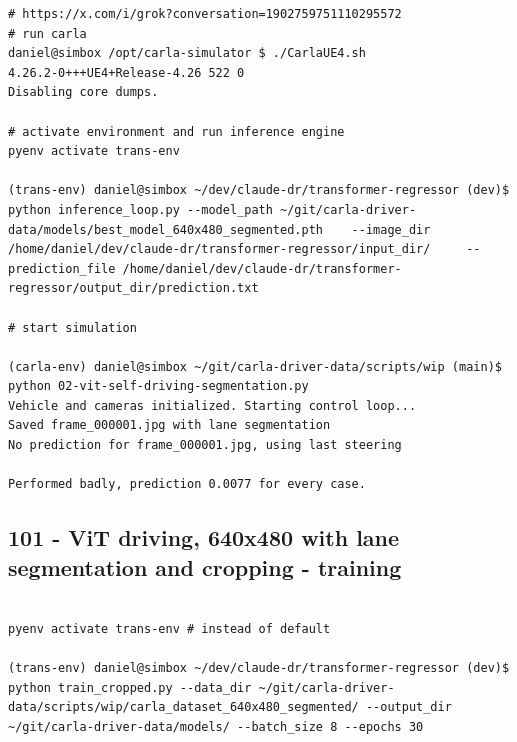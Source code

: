 \begin{verbatim}
# https://x.com/i/grok?conversation=1902759751110295572
# run carla
daniel@simbox /opt/carla-simulator $ ./CarlaUE4.sh 
4.26.2-0+++UE4+Release-4.26 522 0
Disabling core dumps.

# activate environment and run inference engine
pyenv activate trans-env

(trans-env) daniel@simbox ~/dev/claude-dr/transformer-regressor (dev)$ python inference_loop.py --model_path ~/git/carla-driver-data/models/best_model_640x480_segmented.pth    --image_dir /home/daniel/dev/claude-dr/transformer-regressor/input_dir/     --prediction_file /home/daniel/dev/claude-dr/transformer-regressor/output_dir/prediction.txt

# start simulation

(carla-env) daniel@simbox ~/git/carla-driver-data/scripts/wip (main)$ python 02-vit-self-driving-segmentation.py 
Vehicle and cameras initialized. Starting control loop...
Saved frame_000001.jpg with lane segmentation
No prediction for frame_000001.jpg, using last steering

Performed badly, prediction 0.0077 for every case.

\end{verbatim}

\subsection{101 - ViT driving, 640x480 with lane segmentation and cropping - training}
\label{app_res:100b}

\begin{verbatim}

pyenv activate trans-env # instead of default 

(trans-env) daniel@simbox ~/dev/claude-dr/transformer-regressor (dev)$ python train_cropped.py --data_dir ~/git/carla-driver-data/scripts/wip/carla_dataset_640x480_segmented/ --output_dir ~/git/carla-driver-data/models/ --batch_size 8 --epochs 30

\end{verbatim}


